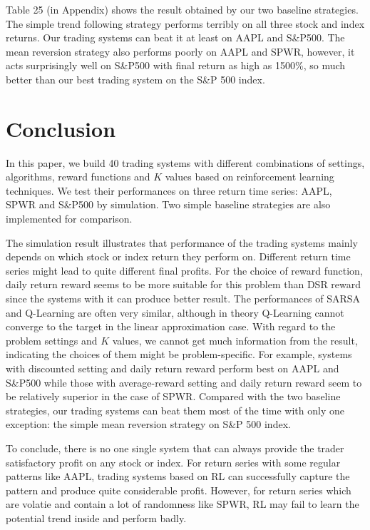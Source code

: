 \documentclass{article}
\begin{document}
\indent Table 25 (in Appendix) shows the result obtained by our two baseline strategies. The simple trend following strategy performs terribly on all three stock and index returns. Our trading systems can beat it at least on AAPL and S\&P500. The mean reversion strategy also performs poorly on AAPL and SPWR, however, it acts surprisingly well on S\&P500 with final return as high as 1500\%, so much better than our best trading system on the S\&P 500 index.




\section{Conclusion} %

\noindent In this paper, we build 40 trading systems with different combinations of settings, algorithms, reward functions and $K$ values based on reinforcement learning techniques. We test their performances on three return time series: AAPL, SPWR and S\&P500 by simulation. Two simple baseline strategies are also implemented for comparison.


\indent The simulation result illustrates that performance of the trading systems mainly depends on which stock or index return they perform on. Different return time series might lead to quite different final profits. For the choice of reward function, daily return reward seems to be more suitable for this problem than DSR reward since the systems with it can produce better result. The performances of SARSA and Q-Learning are often very similar, although in theory Q-Learning cannot converge to the target in the linear approximation case. With regard to the problem settings and $K$ values, we cannot get much information from the result, indicating the choices of them might be problem-specific. For example, systems with discounted setting and daily return reward perform best on AAPL and S\&P500 while those with average-reward setting and daily return reward seem to be relatively superior in the case of SPWR. Compared with the two baseline strategies, our trading systems can beat them most of the time with only one exception: the simple mean reversion strategy on S\&P 500 index.

\indent To conclude, there is no one single system that can always provide the trader satisfactory profit on any stock or index. For return series with some regular patterns like AAPL, trading systems based on RL can successfully capture the pattern and produce quite considerable profit. However, for return series which are volatie and contain a lot of randomness like SPWR, RL may fail to learn the potential trend inside and perform badly.
\end{document}
